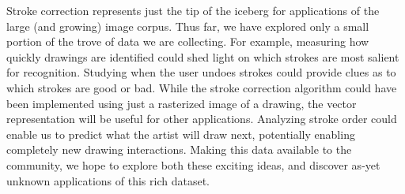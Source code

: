 Stroke correction represents just the tip of the iceberg for
applications of the large (and growing) \daf image corpus. Thus far, we have explored only a
small portion of the trove of data we are collecting. For example,
measuring how quickly drawings are identified could shed light on
which strokes are most salient for recognition. Studying when the
user undoes strokes could provide clues as to which strokes are
good or bad. While the stroke correction algorithm could have been implemented using just a rasterized image of a drawing, the vector representation will be useful for other applications. Analyzing stroke order could enable us to predict what
the artist will draw next, potentially enabling completely new
drawing interactions. Making this data available to the community,
we hope to explore both these exciting ideas, and discover as-yet
unknown applications of this rich dataset.


%
%
%
%
%
%
%
%
% 	
%
%
%
%
%
